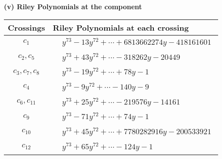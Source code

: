 \documentclass[1p]{elsarticle_modified}
\theoremstyle{definition}
\begin{document}
\newpage\renewcommand{\arraystretch}{1}
\flushleft \textbf{(v) Riley Polynomials at the component}\newline \\
\begin{tabular}{m{50pt}|m{274pt}}
Crossings & \hspace{64pt}Riley Polynomials at each crossing \\
\hline $$\begin{aligned}c_{1}\end{aligned}$$&$\begin{aligned}
&y^{73}-13 y^{72}+\cdots+6813662274 y-418161601
\end{aligned}$\\
\hline $$\begin{aligned}c_{2},c_{5}\end{aligned}$$&$\begin{aligned}
&y^{73}+43 y^{72}+\cdots-318262 y-20449
\end{aligned}$\\
\hline $$\begin{aligned}c_{3},c_{7},c_{8}\end{aligned}$$&$\begin{aligned}
&y^{73}-19 y^{72}+\cdots+78 y-1
\end{aligned}$\\
\hline $$\begin{aligned}c_{4}\end{aligned}$$&$\begin{aligned}
&y^{73}-9 y^{72}+\cdots-140 y-9
\end{aligned}$\\
\hline $$\begin{aligned}c_{6},c_{11}\end{aligned}$$&$\begin{aligned}
&y^{73}+25 y^{72}+\cdots-219576 y-14161
\end{aligned}$\\
\hline $$\begin{aligned}c_{9}\end{aligned}$$&$\begin{aligned}
&y^{73}-71 y^{72}+\cdots+74 y-1
\end{aligned}$\\
\hline $$\begin{aligned}c_{10}\end{aligned}$$&$\begin{aligned}
&y^{73}+45 y^{72}+\cdots+7780282916 y-200533921
\end{aligned}$\\
\hline $$\begin{aligned}c_{12}\end{aligned}$$&$\begin{aligned}
&y^{73}+65 y^{72}+\cdots-124 y-1
\end{aligned}$\\
\hline
\end{tabular}\\~\\
\end{document}

